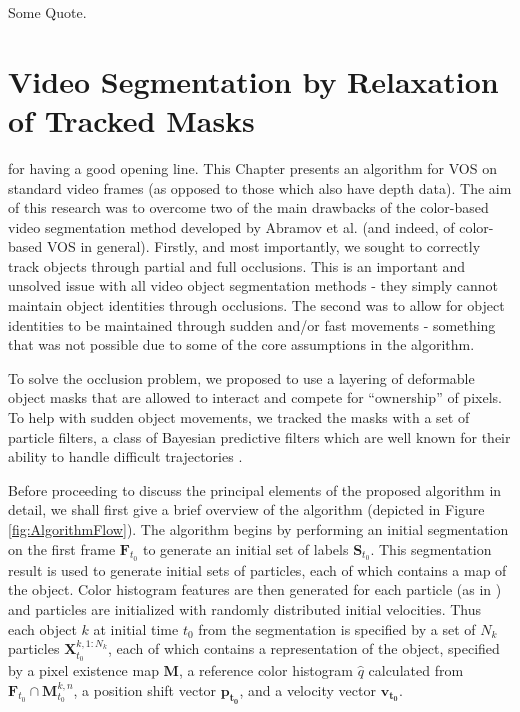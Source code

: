 \begin{savequote}[75mm]
Some Quote.
\end{savequote}


\chapter{Video Segmentation by Relaxation of Tracked Masks}
\label{Chap:VideoSegRelaxation}
 for having a good opening line. 
This Chapter presents an algorithm for VOS on standard video frames (as opposed to those which also have depth data). The aim of this research was to overcome two of the main drawbacks of the color-based video segmentation method developed by Abramov et al. \cite{Abramov_RealtimeSegmentation} (and indeed, of color-based VOS in general). Firstly, and most importantly, we sought to correctly track objects through partial and full occlusions. This is an important and unsolved issue with all video object segmentation methods - they simply cannot maintain object identities through occlusions. The second was to allow for object identities to be maintained through sudden and/or fast movements - something that was not possible due to some of the core assumptions in the algorithm.

To solve the occlusion problem, we proposed to use a layering of deformable object masks that are allowed to interact and compete for ``ownership'' of pixels. To help with sudden object movements, we tracked the masks with a set of particle filters, a class of Bayesian predictive filters which are well known for their ability to handle difficult trajectories \cite{TrackingMultipleParticleFiltering,MonteCarloMTT,SequentialMonteCarloMultitargetFiltering}.

Before proceeding to discuss the principal elements of the proposed algorithm in detail, we shall first give a brief overview of the algorithm (depicted in Figure \ref{fig:AlgorithmFlow}). The algorithm begins by performing an initial segmentation on the first frame $\mathbf{F}_{t_0}$ to generate an initial set of labels $\mathbf{S}_{t_0}$. This segmentation result is used to generate initial sets of particles, each of which contains a map of the object. Color histogram features are then generated for each particle (as in \cite{ColorBasedProbabilisticTracking}) and particles are initialized with randomly distributed initial velocities. Thus each object $k$ at initial time $t_0$ from the segmentation is specified by a set of $N_k$ particles $\mathbf{X}^{k,1:N_k}_{t_0}$, each of which contains a representation of the object, specified by a pixel existence map $\mathbf{M}$, a reference color histogram $\mathit{\hat{q}}$ calculated from $\mathbf{F}_{t_0} \cap \mathbf{M}^{k,n}_{t_0}$, a position shift vector $\mathbf{p_{t_0}}$, and a velocity vector $\mathbf{v_{t_0}}$.

